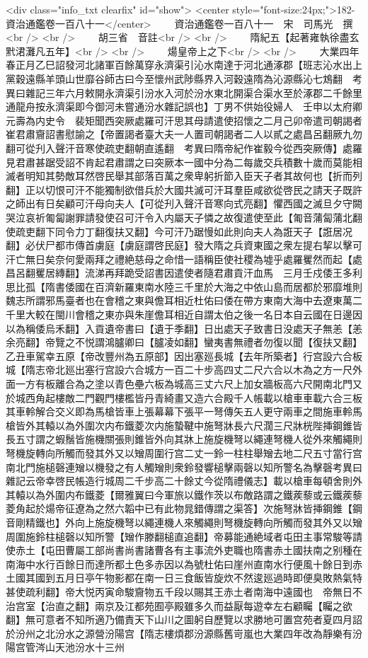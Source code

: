<div class="info_txt clearfix" id="show">
<center style="font-size:24px;">182-資治通鑑卷一百八十一</center>
  　　資治通鑑卷一百八十一　宋　司馬光　撰<br />
<br />
　　胡三省　音註<br />
<br />
　　隋紀五【起著雍執徐盡玄黓涒灘凡五年】<br />
<br />
　　煬皇帝上之下<br />
<br />
　　大業四年春正月乙巳詔發河北諸軍百餘萬穿永濟渠引沁水南達于河北通涿郡【班志沁水出上黨穀遠縣羊頭山世靡谷師古曰今至懷州武陟縣界入河穀遠隋為沁源縣沁七鴆翻　考異曰雜記三年六月敕開永濟渠引汾水入河於汾水東北開渠合渠水至於涿郡二千餘里通龍舟按永濟渠即今御河未嘗通汾水雜記誤也】丁男不供始役婦人　壬申以太府卿元壽為内史令　裴矩聞西突厥處羅可汗思其母請遣使招懷之二月己卯帝遣司朝謁者崔君肅齎詔書慰諭之【帝置謁者臺大夫一人置司朝謁者二人以貳之處昌呂翻厥九勿翻可從刋入聲汗音寒使疏吏翻朝直遙翻　考異曰隋帝紀作崔毅今從西突厥傳】處羅見君肅甚踞受詔不肯起君肅謂之曰突厥本一國中分為二每歲交兵積數十歲而莫能相滅者明知其勢敵耳然啓民舉其部落百萬之衆卑躬折節入臣天子者其故何也【折而列翻】正以切恨可汗不能獨制欲借兵於大國共滅可汗耳羣臣咸欲從啓民之請天子既許之師出有日矣顧可汗母向夫人【可從刋入聲汗音寒向式亮翻】懼西國之滅旦夕守闕哭泣哀祈匍匐謝罪請發使召可汗令入内屬天子憐之故復遣使至此【匍音蒲匐蒲北翻使疏吏翻下同令力丁翻復扶又翻】今可汗乃踞慢如此則向夫人為誑天子【誑居况翻】必伏尸都市傳首虜庭【虜庭謂啓民庭】發大隋之兵資東國之衆左提右挈以擊可汗亡無日矣奈何愛兩拜之禮絶慈母之命惜一語稱臣使社稷為墟乎處羅矍然而起【處昌呂翻矍居縳翻】流涕再拜跪受詔書因遣使者隨君肅貢汗血馬　三月壬戍倭王多利思比孤【隋書倭國在百濟新羅東南水陸三千里於大海之中依山島而居都於邪靡堆則魏志所謂邪馬臺者也在會稽之東與儋耳相近杜佑曰倭在帶方東南大海中去遼東萬二千里大較在閩川會稽之東亦與朱崖儋耳相近自謂太伯之後一名日本自云國在日邊因以為稱倭烏禾翻】入貢遺帝書曰【遺于季翻】日出處天子致書日没處天子無恙【恙余亮翻】帝覽之不悦謂鴻臚卿曰【臚凌如翻】蠻夷書無禮者勿復以聞【復扶又翻】　乙丑車駕幸五原【帝改豐州為五原部】因出塞廵長城【去年所築者】行宫設六合板城【隋志帝北廵出塞行宫設六合城方一百二十步高四丈二尺六合以木為之方一尺外面一方有板離合為之塗以青色壘六板為城高三丈六尺上加女牆板高六尺開南北門又於城西角起樓敵二門觀門樓檻皆丹青綺畫又造六合殿千人帳載以槍車車載六合三板其車軨解合交义即為馬槍皆車上張幕幕下張平一弩傳矢五人更守兩車之間施車軨馬槍皆外其轅以為外圍次内布鐵菱次内施蟄鞬中施弩牀長六尺濶三尺牀桄陛挿鋼錐皆長五寸謂之蝦鬚皆施機關張則錐皆外向其牀上施旋機弩以繩連弩機人從外來觸繩則弩機旋轉向所觸而發其外又以矰周圍行宫二丈一鈴一柱柱舉矰去地二尺五寸當行宫南北門施槌磬連矰以機發之有人觸矰則衆鈴發響槌擊兩磬以知所警名為擊磬考異曰雜記云帝幸啓民帳造行城周二千步高二十餘丈今從隋禮儀志】載以槍車每頓舍則外其轅以為外圍内布鐵菱【爾雅翼曰今軍旅以鐵作茨以布敵路謂之鐵蒺藜或云鐵蒺藜菱角起於煬帝征遼為之然六韜中已有此物晁錯傳謂之渠答】次施弩牀皆挿鋼錐【鋼音剛精鐵也】外向上施旋機弩以繩連機人來觸繩則弩機旋轉向所觸而發其外又以矰周圍施鈴柱槌磬以知所警【矰作滕翻槌直追翻】帝募能通絶域者屯田主事常駿等請使赤土【屯田曹屬工部尚書尚書諸曹各有主事流外吏職也隋書赤土國扶南之别種在南海中水行百餘日而達所都土色多赤因以為號杜佑曰崖州直南水行便風十餘日到赤土國其國到五月日亭午物影都在南一日三食飯皆旋炊不然逡廵過時即便臭敗熱氣特甚使疏利翻】帝大悦丙寅命駿齎物五千段以賜其王赤土者南海中遠國也　帝無日不治宫室【治直之翻】兩京及江都苑囿亭殿雖多久而益厭每遊幸左右顧矚【矚之欲翻】無可意者不知所適乃備責天下山川之圖躬自歷覽以求勝地可置宫苑者夏四月詔於汾州之北汾水之源營汾陽宫【隋志樓煩郡汾源縣舊岢嵐也大業四年改為靜樂有汾陽宫管涔山天池汾水十三州